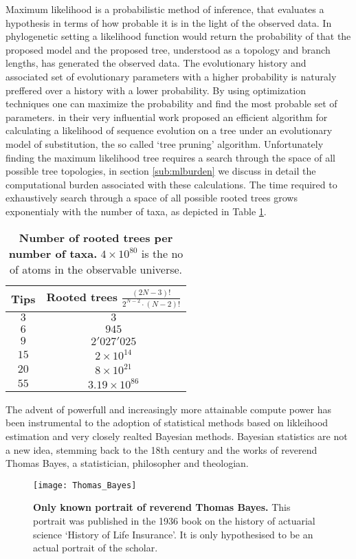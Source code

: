 Maximum likelihood is a probabilistic method of inference, that evaluates a hypothesis in terms of how probable it is in the light of the observed data.
In phylogenetic setting a likelihood function would return the probability of that the proposed model and the proposed tree, understood as a topology and branch lengths, has generated the observed data.
The evolutionary history and associated set of evolutionary parameters with a higher probability is naturaly preffered over a history with a lower probability.
By using optimization techniques one can maximize the probability and find the most probable set of parameters.
\cite{Felsenstein1981} in their very influential work proposed an efficient algorithm for calculating a likelihood of sequence evolution on a tree under an evolutionary model of substitution, the so called `tree pruning' algorithm.
Unfortunately finding the maximum likelihood tree requires a search through the space of all possible tree topologies, in section \ref{sub:mlburden} we discuss in detail the computational burden associated with these calculations.
The time required to exhaustively search through a space of all possible rooted trees grows exponentialy with the number of taxa, as depicted in Table \ref{tab:maxLikeBurden}.

\begin{table}[H]
\centering
\begin{tabular}{cc}
\hline 
Tips & Rooted trees $\frac{(2N-3)!}{2^{N-2}\cdot(N-2)!}$ \tabularnewline
\hline 
\rowcolor{gray1}
$3$ & $3$\tabularnewline
$6$ & $945$\tabularnewline
\rowcolor{gray1}
$9$ & $2'027'025$\tabularnewline
$15$ & $2\times10^{14}$\tabularnewline
\rowcolor{gray1}
$20$ & $8\times10^{21}$\tabularnewline
$55$ & $3.19\times10^{86}$\tabularnewline
\end{tabular}
\caption{
{ \footnotesize 
{\bf{Number of rooted trees per number of taxa.}} $4 \times 10^{80} $ is the no of atoms in the observable universe.
}%
}
\label{tab:maxLikeBurden}
\end{table}

The advent of powerfull and increasingly more attainable compute power has been instrumental to the adoption of statistical methods based on likleihood estimation and very closely realted Bayesian methods.
Bayesian statistics are not a new idea, stemming back to the 18th century and the works of reverend Thomas Bayes, a statistician, philosopher and theologian. 

\begin{figure}[H]
\centering
\texttt{[image: Thomas\_Bayes]} 
\caption{
{ \footnotesize 
{\bf Only known portrait of reverend Thomas Bayes.} This portrait was published in the 1936 book on the history of actuarial science `History of Life Insurance'. It is only hypothesised to be an actual portrait of the scholar.
}%
}
\label{fig:bayes}
\end{figure}

